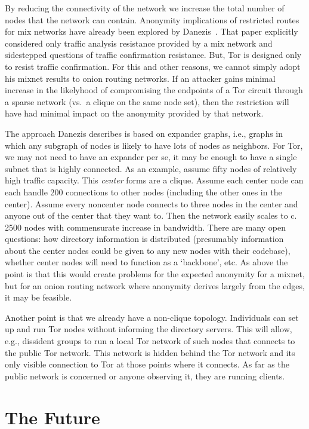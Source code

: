 \documentclass{llncs}
\begin{document}
By reducing the connectivity of the network we increase the total
number of nodes that the network can contain. Anonymity implications
of restricted routes for mix networks have already been explored by
Danezis~\cite{danezis-pets03}.  That paper explicitly considered only
traffic analysis resistance provided by a mix network and sidestepped
questions of traffic confirmation resistance. But, Tor is designed
only to resist traffic confirmation. For this and other reasons, we
cannot simply adopt his mixnet results to onion routing networks.  If
an attacker gains minimal increase in the likelyhood of compromising
the endpoints of a Tor circuit through a sparse network (vs.\ a clique
on the same node set), then the restriction will have had minimal
impact on the anonymity provided by that network.

The approach Danezis describes is based on expander graphs, i.e.,
graphs in which any subgraph of nodes is likely to have lots of nodes
as neighbors. For Tor, we may not need to have an expander per se, it
may be enough to have a single subnet that is highly connected.  As an
example, assume fifty nodes of relatively high traffic capacity.  This
\emph{center} forms are a clique.  Assume each center node can each
handle 200 connections to other nodes (including the other ones in the
center). Assume every noncenter node connects to three nodes in the
center and anyone out of the center that they want to.  Then the
network easily scales to c. 2500 nodes with commensurate increase in
bandwidth. There are many open questions: how directory information
is distributed (presumably information about the center nodes could
be given to any new nodes with their codebase), whether center nodes
will need to function as a `backbone', etc. As above the point is
that this would create problems for the expected anonymity for a mixnet,
but for an onion routing network where anonymity derives largely from
the edges, it may be feasible.

Another point is that we already have a non-clique topology.
Individuals can set up and run Tor nodes without informing the
directory servers. This will allow, e.g., dissident groups to run a
local Tor network of such nodes that connects to the public Tor
network. This network is hidden behind the Tor network and its
only visible connection to Tor at those points where it connects.
As far as the public network is concerned or anyone observing it,
they are running clients.




\section{The Future}
\label{sec:conclusion}
\end{document}
